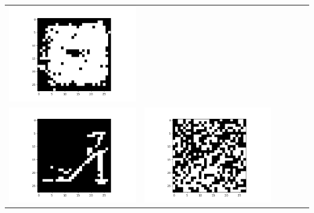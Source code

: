 \documentclass[12pt]{report}
\begin{document}
\begin{table}[H]
\begin{tabular}{  c  c  c  c  c  c }
\begin{minipage}{.15\textwidth}
      \includegraphics[scale=0.2]{BM_e40.png}
    \end{minipage} \\ 
    \begin{minipage}{.15\textwidth}
      \includegraphics[scale=0.2]{BM_fvisual.png}
    \end{minipage} & 
    \begin{minipage}{.15\textwidth}
      \includegraphics[scale=0.2]{BM_f1.png}

\end{minipage}
\end{tabular}
\end{table}
\end{document}
